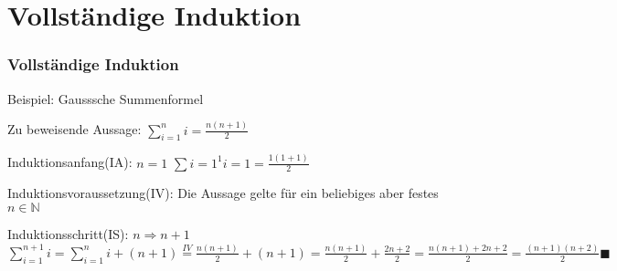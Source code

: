 \section{Vollständige Induktion}
\begin{frame}
    \frametitle{Vollständige Induktion}
    Beispiel: Gausssche Summenformel

    Zu beweisende Aussage: $\sum_{i=1}^{n} i = \frac{n(n+1)}{2}$

    Induktionsanfang(IA): $n = 1$
    $\sum{i=1}^{1} i = 1 = \frac{1(1+1)}{2}$

    Induktionsvoraussetzung(IV): Die Aussage gelte für ein beliebiges aber festes $n \in \mathbb{N}$

    Induktionsschritt(IS): $n \Rightarrow n+1$\newline
    $\sum_{i=1}^{n+1} i = \sum_{i=1}^{n} i + (n+1) \stackrel{IV}{=} \frac{n(n+1)}{2} + (n+1) = \frac{n(n+1)}{2} + \frac{2n+2}{2} = \frac{n(n+1)+2n+2}{2} = \frac{(n+1)(n+2)}{2} \blacksquare$
\end{frame}
